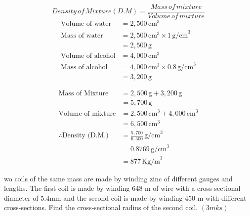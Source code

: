 \documentclass[
  a4paperpaper,
]{scrbook}
\begin{document}
\begin{tcolorbox}[enhanced jigsaw, left=2mm, colframe=quarto-callout-caution-color-frame, toptitle=1mm, opacitybacktitle=0.6, rightrule=.15mm, colbacktitle=quarto-callout-caution-color!10!white, colback=white, arc=.35mm, breakable, leftrule=.75mm, bottomtitle=1mm, bottomrule=.15mm, title=\textcolor{quarto-callout-caution-color}{\faFire}\hspace{0.5em}{Solution}, titlerule=0mm, coltitle=black, toprule=.15mm, opacityback=0]

\[Density \,of \,Mixture (D.M)=\frac{Mass\, of\,mixture}{Volume\, of \,mixture}\]
\[
\begin{aligned}
\text{Volume of water} &= 2,500 \, \text{cm}^3 \\
\text{Mass of water} &= 2,500 \, \text{cm}^3 \times 1 \, \text{g/cm}^3 \\
&= 2,500 \, \text{g} \\
\text{Volume of alcohol} &= 4,000 \, \text{cm}^3 \\
\text{Mass of alcohol} &= 4,000 \, \text{cm}^3 \times 0.8 \, \text{g/cm}^3 \\
&= 3,200 \, \text{g}
\end{aligned}
\]

\[
\begin{aligned}
\text{Mass of Mixture} &= 2,500 \, \text{g} + 3,200 \, \text{g} \\
&= 5,700 \, \text{g} \\
\text{Volume of mixture} &= 2,500 \, \text{cm}^3 + 4,000 \, \text{cm}^3 \\
&= 6,500 \, \text{cm}^3 \\
\therefore \text{Density (D.M.)} &= \frac{5,700}{6,500} \, \text{g/cm}^3 \\
&= 0.8769 \, \text{g/cm}^3 \\
&= 877 \, \text{Kg/m}^3
\end{aligned}
\]

\end{tcolorbox}

\begin{tcolorbox}[enhanced jigsaw, left=2mm, colframe=quarto-callout-note-color-frame, toptitle=1mm, opacitybacktitle=0.6, rightrule=.15mm, colbacktitle=quarto-callout-note-color!10!white, colback=white, arc=.35mm, breakable, leftrule=.75mm, bottomtitle=1mm, bottomrule=.15mm, title=\textcolor{quarto-callout-note-color}{\faInfo}\hspace{0.5em}{Example 2}, titlerule=0mm, coltitle=black, toprule=.15mm, opacityback=0]

wo coils of the same mass are made by winding zinc of different gauges
and lengths. The first coil is made by winding 648 m of wire with a
cross-sectional diameter of 5.4mm and the second coil is made by winding
450 m with different cross-sections. Find the cross-sectional radius of
the second coil. \((3mks)\)

\end{tcolorbox}
\end{document}
